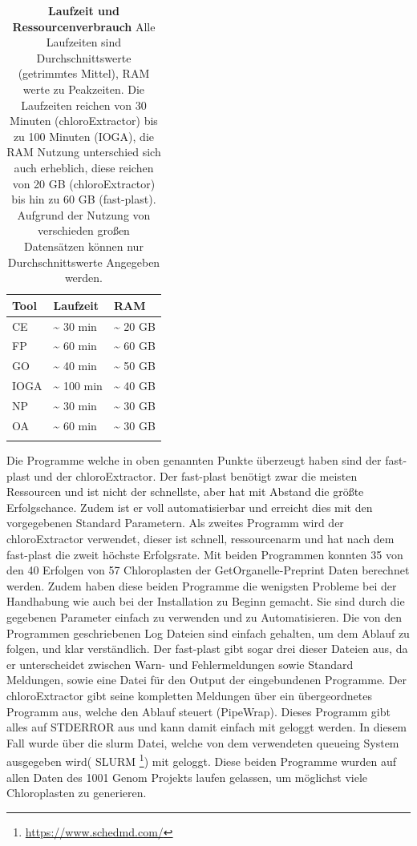 \documentclass{scrartcl}
\begin{document}
\begin{table}[!h]
\caption[Laufzeit und Ressourcenverbrauch]{\textbf{Laufzeit und Ressourcenverbrauch} Alle Laufzeiten sind Durchschnittswerte (getrimmtes Mittel), RAM werte zu Peakzeiten. Die Laufzeiten reichen von 30 Minuten (chloroExtractor) bis zu 100 Minuten (IOGA), die RAM Nutzung unterschied sich auch erheblich, diese reichen von 20 GB (chloroExtractor) bis hin zu 60 GB (fast-plast). Aufgrund der Nutzung von verschieden großen Datensätzen können nur Durchschnittswerte Angegeben werden.}
\begin{center}
\begin{tabular}{lll}
Tool & Laufzeit & RAM\\
\hline
CE & \textasciitilde{}  30 min & \textasciitilde{} 20 GB\\
FP & \textasciitilde{}  60 min & \textasciitilde{} 60 GB\\
GO & \textasciitilde{}  40 min & \textasciitilde{} 50 GB\\
IOGA & \textasciitilde{} 100 min & \textasciitilde{} 40 GB\\
NP & \textasciitilde{}  30 min & \textasciitilde{} 30 GB\\
OA & \textasciitilde{}  60 min & \textasciitilde{} 30 GB\\
 &  & \\
\end{tabular}
\end{center}
\end{table}
Die Programme welche in oben genannten Punkte überzeugt haben sind der fast-plast und der chloroExtractor. Der fast-plast benötigt zwar die 
meisten Ressourcen und ist nicht der schnellste, aber hat mit Abstand die größte Erfolgschance. Zudem ist er voll automatisierbar und erreicht 
dies mit den vorgegebenen Standard Parametern. Als zweites Programm wird der chloroExtractor verwendet, dieser ist schnell, ressourcenarm und hat nach dem
fast-plast die zweit höchste Erfolgsrate. Mit beiden Programmen konnten 35 von den 40 Erfolgen von 57 Chloroplasten der GetOrganelle-Preprint Daten berechnet werden.
Zudem haben diese beiden Programme die wenigsten
Probleme bei der Handhabung wie auch bei der Installation zu Beginn gemacht. Sie sind durch die gegebenen Parameter einfach zu verwenden und zu Automatisieren.
Die von den Programmen geschriebenen Log Dateien sind einfach gehalten, um dem Ablauf zu folgen, und klar verständlich. Der fast-plast gibt sogar drei dieser
Dateien aus, da er unterscheidet zwischen Warn- und Fehlermeldungen sowie Standard Meldungen, sowie eine Datei für den Output der eingebundenen Programme. 
Der chloroExtractor gibt seine kompletten Meldungen über ein übergeordnetes Programm aus, welche den Ablauf steuert (PipeWrap). Dieses Programm gibt alles auf STDERROR aus und 
kann damit einfach mit geloggt werden. In diesem Fall wurde über die slurm Datei, welche von dem verwendeten queueing System ausgegeben wird( SLURM \footnote{\url{https://www.schedmd.com/}
\clearpage}) mit geloggt. 
Diese beiden Programme wurden auf allen Daten des 1001 Genom Projekts laufen gelassen, um möglichst viele Chloroplasten zu generieren. 
\end{document}
